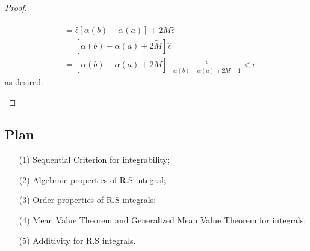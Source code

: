 \begin{proof}
\begin{enumerate}
\begin{align*}
                                                                                       &= \hat{\epsilon} [\alpha(b) - \alpha(a)] + 2 \tilde{M} \hat{\epsilon} \\
                                                                                       &= [\alpha(b) - \alpha(a) + 2 \tilde{M}] \hat{\epsilon} \\
                                                                                       &= [\alpha(b) - \alpha(a) + 2 \tilde{M}] \cdot \frac{ \epsilon }{ \alpha(b) - \alpha(a) + 2 \tilde{M} + 1  }  < \epsilon
            \end{align*}
            as desired.
    \end{enumerate}
\end{proof}

\subsection{Plan}

\begin{enumerate}
    \item[(1)] Sequential Criterion for integrability;
    \item[(2)] Algebraic properties of R.S integral;
    \item[(3)] Order properties of R.S integrals;
    \item[(4)] Mean Value Theorem and Generalized Mean Value Theorem for integrals;
    \item[(5)] Additivity for R.S integrals.
\end{enumerate}

